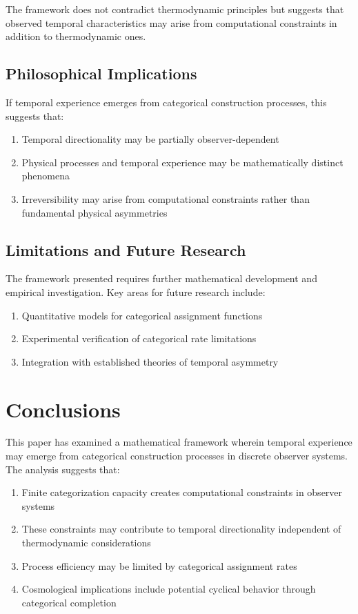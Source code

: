 \documentclass[12pt,a4paper]{article}
\theoremstyle{remark}
\begin{document}
The framework does not contradict thermodynamic principles but suggests that observed temporal characteristics may arise from computational constraints in addition to thermodynamic ones.

\subsection{Philosophical Implications}

If temporal experience emerges from categorical construction processes, this suggests that:

\begin{enumerate}
\item Temporal directionality may be partially observer-dependent
\item Physical processes and temporal experience may be mathematically distinct phenomena
\item Irreversibility may arise from computational constraints rather than fundamental physical asymmetries
\end{enumerate}

\subsection{Limitations and Future Research}

The framework presented requires further mathematical development and empirical investigation. Key areas for future research include:

\begin{enumerate}
\item Quantitative models for categorical assignment functions
\item Experimental verification of categorical rate limitations
\item Integration with established theories of temporal asymmetry
\end{enumerate}

\section{Conclusions}

This paper has examined a mathematical framework wherein temporal experience may emerge from categorical construction processes in discrete observer systems. The analysis suggests that:

\begin{enumerate}
\item Finite categorization capacity creates computational constraints in observer systems
\item These constraints may contribute to temporal directionality independent of thermodynamic considerations
\item Process efficiency may be limited by categorical assignment rates
\item Cosmological implications include potential cyclical behavior through categorical completion
\end{enumerate}
\end{document}
